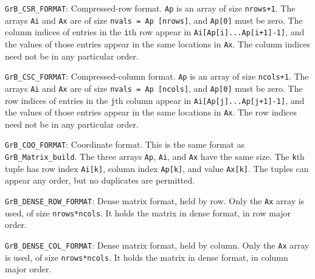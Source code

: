 \documentclass[12pt]{article}
\newenvironment{packed_itemize}{
\begin{itemize}
  \setlength{\itemsep}{1pt}
  \setlength{\parskip}{0pt}
  \setlength{\parsep}{0pt}
}{\end{itemize}}
\begin{document}
\begin{packed_itemize}
    \item \verb'GrB_CSR_FORMAT': %
        Compressed-row format.  \verb'Ap' is an array of size \verb'nrows+1'.
        The arrays \verb'Ai' and \verb'Ax' are of size \verb'nvals = Ap [nrows]',
        and \verb'Ap[0]' must be zero.
        The column indices of entries in the \verb'i'th row appear in
        \verb'Ai[Ap[i]...Ap[i+1]-1]', and the values of those entries appear in
        the same locations in \verb'Ax'.
        The column indices need not be in any particular order.

    \item \verb'GrB_CSC_FORMAT': %
        Compressed-column format.  \verb'Ap' is an array of size \verb'ncols+1'.
        The arrays \verb'Ai' and \verb'Ax' are of size \verb'nvals = Ap [ncols]',
        and \verb'Ap[0]' must be zero.
        The row indices of entries in the \verb'j'th column appear in
        \verb'Ai[Ap[j]...Ap[j+1]-1]', and the values of those entries appear in
        the same locations in \verb'Ax'.
        The row indices need not be in any particular order.
        
    \item \verb'GrB_COO_FORMAT': %
        Coordinate format.  This is the same format as \newline
        \verb'GrB_Matrix_build'.
        The three arrays \verb'Ap', \verb'Ai', and \verb'Ax' have the same
        size.  The \verb'k'th tuple has row index \verb'Ai[k]',
        column index \verb'Ap[k]', and value \verb'Ax[k]'.  The tuples can
        appear any order, but no duplicates are permitted.

    \item \verb'GrB_DENSE_ROW_FORMAT': %
        Dense matrix format, held by row.  Only the \verb'Ax' array is used, of
        size \verb'nrows*ncols'.
        It holds the matrix in dense format, in row major order.

    \item \verb'GrB_DENSE_COL_FORMAT': %
        Dense matrix format, held by column.  Only the \verb'Ax' array is used, of
        size \verb'nrows*ncols'.
        It holds the matrix in dense format, in column major order.
\end{packed_itemize}
\end{document}
